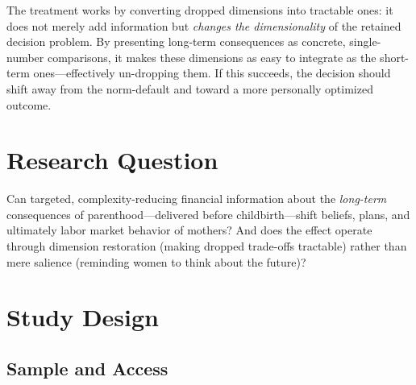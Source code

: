 \documentclass[12pt,a4paper]{article}
\begin{document}
\begin{center}
{%
}%
\end{center}

The treatment works by converting dropped dimensions into tractable ones: it does not merely add information but \emph{changes the dimensionality} of the retained decision problem. By presenting long-term consequences as concrete, single-number comparisons, it makes these dimensions as easy to integrate as the short-term ones---effectively un-dropping them. If this succeeds, the decision should shift away from the norm-default and toward a more personally optimized outcome.

\section{Research Question}

Can targeted, complexity-reducing financial information about the \emph{long-term} consequences of parenthood---delivered before childbirth---shift beliefs, plans, and ultimately labor market behavior of mothers? And does the effect operate through dimension restoration (making dropped trade-offs tractable) rather than mere salience (reminding women to think about the future)?

\section{Study Design}

\subsection{Sample and Access}
\end{document}
